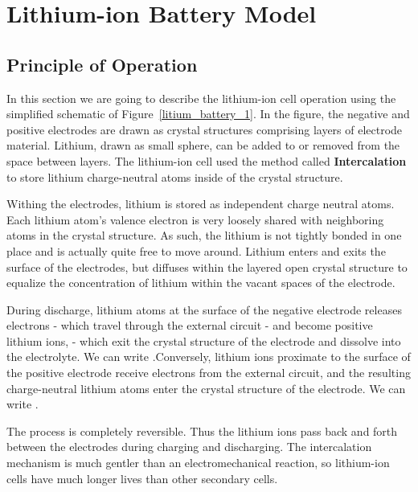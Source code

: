 \documentclass[11pt,a4paper,oneside]{book}
\numberwithin{equation}{section}
\theoremstyle{it}
\theoremstyle{definition}
\begin{document}
\section{Lithium-ion Battery Model}
\subsection{Principle of Operation}
In this section we are going to describe the lithium-ion cell operation using the simplified schematic of Figure~\ref{litium_battery_1}. In the figure, the negative and positive electrodes are drawn as crystal structures comprising layers of electrode material. Lithium, drawn as small sphere, can be added to or removed from the space between layers. The lithium-ion cell used the method called \textbf{Intercalation} to store lithium charge-neutral atoms inside of the crystal structure.

Withing the electrodes, lithium is stored as independent charge neutral atoms. Each lithium atom's valence electron is very loosely shared with neighboring atoms in the crystal structure. As such, the lithium is not tightly bonded in one place and is actually quite free to move around. Lithium enters and exits the surface of the electrodes, but diffuses within the layered open crystal structure to equalize the concentration of lithium within the vacant spaces of the electrode.

During discharge, lithium atoms at the surface of the negative electrode releases electrons - which travel through the external circuit - and become positive lithium ions,  - which exit the crystal structure of the electrode and dissolve into the electrolyte. We can write .Conversely, lithium ions proximate to the surface of the positive electrode receive electrons from the external circuit, and the resulting charge-neutral lithium atoms enter the crystal structure of the electrode. We can write .

The process is completely reversible. Thus the lithium ions pass back and forth between the electrodes during charging and discharging. The intercalation mechanism is much gentler than an electromechanical reaction, so lithium-ion cells have much longer lives than other secondary cells.
\end{document}
